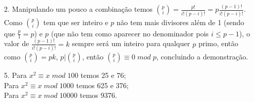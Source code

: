 \documentclass[12pt, a4paper]{article} %
\begin{document}
\begin{enumerate}
\begin{enumerate}
\end{enumerate}
\item[2.]
Manipulando um pouco a combinação temos $\binom{p}{i} = \frac{p!}{i!(p-i)!} = p\frac{(p-1)!}{i!(p-i)!}$. Como $\binom{p}{i}$ tem que ser inteiro e $p$ não tem mais divisores além de 1 (sendo que $\frac{p}{1}=p$) e $p$ (que não tem como aparecer no denominador pois $i \leqslant p-1$), o valor de $\frac{(p-1)!}{i!(p-i)!} = k$ sempre será um inteiro para qualquer $p$ primo, então como $\binom{p}{i} = pk$, $p|\binom{p}{i}$, então $\binom{p}{i} \equiv 0\; mod\; p$, concluindo a demonstração.
\item[5.]
Para $x^2 \equiv x\; mod\; 100$ temos 25 e 76;\\
Para $x^2 \equiv x\; mod\; 1000$ temos 625 e 376; \\
Para $x^2 \equiv x\; mod\; 10000$ temos 9376. \\

\end{enumerate}
\end{document}
